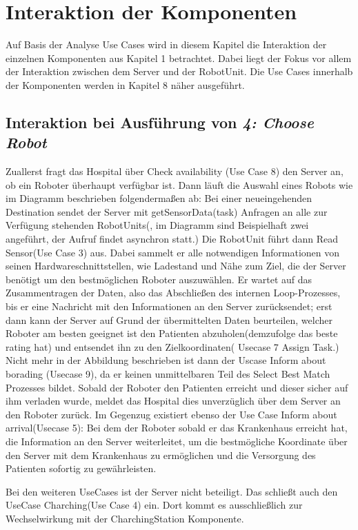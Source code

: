\section{Interaktion der Komponenten}
Auf Basis der Analyse Use Cases wird in diesem Kapitel die Interaktion der einzelnen Komponenten aus Kapitel 1 betrachtet. Dabei liegt der Fokus vor allem der Interaktion zwischen dem Server und der RobotUnit. Die Use Cases innerhalb der Komponenten werden in Kapitel 8 näher ausgeführt. \\


\subsection*{Interaktion bei Ausführung von \emph{4: Choose Robot}}

Zuallerst fragt das Hospital über Check availability (Use Case 8) den Server an, ob ein Roboter überhaupt verfügbar ist. Dann läuft die Auswahl eines Robots wie im Diagramm beschrieben folgendermaßen ab: Bei einer neueingehenden Destination sendet der Server mit getSensorData(task) Anfragen an alle zur Verfügung stehenden RobotUnits(, im Diagramm sind Beispielhaft zwei angeführt, der Aufruf findet asynchron statt.) Die RobotUnit führt dann Read Sensor(Use Case 3) aus. Dabei sammelt er alle notwendigen Informationen von seinen Hardwareschnittstellen, wie Ladestand und Nähe zum Ziel, die der Server benötigt um den bestmöglichen Roboter auszuwählen. Er wartet auf das Zusammentragen der Daten, also das Abschließen des internen Loop-Prozesses, bis er eine Nachricht mit den Informationen an den Server zurücksendet; erst dann kann der Server auf Grund der übermittelten Daten beurteilen, welcher Roboter am besten geeignet ist den Patienten abzuholen(demzufolge das beste rating hat) und entsendet ihn zu den Zielkoordinaten( Usecase 7 Assign Task.) Nicht mehr in der Abbildung beschrieben ist dann der Uscase Inform about borading (Usecase 9), da er keinen unmittelbaren Teil des Select Best Match Prozesses bildet. Sobald der Roboter den Patienten erreicht und dieser sicher auf ihm verladen wurde, meldet das Hospital dies unverzüglich über dem Server an den Roboter zurück. Im Gegenzug existiert ebenso der Use Case Inform about arrival(Usecase 5): Bei dem der Roboter sobald er das Krankenhaus erreicht hat, die Information an den Server weiterleitet, um die bestmögliche Koordinate über den Server mit dem Krankenhaus zu ermöglichen und die Versorgung des Patienten sofortig zu gewährleisten.

Bei den weiteren UseCases ist der Server nicht beteiligt. Das schließt auch den UseCase Charching(Use Case 4) ein. Dort kommt es ausschließlich zur Wechselwirkung mit der CharchingStation Komponente.


